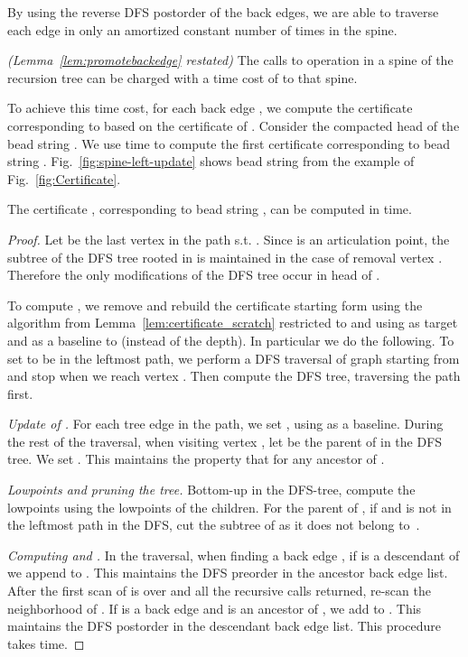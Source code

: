 By using the reverse DFS postorder of the back edges, we are able
to traverse each edge in  only an amortized constant number of
times in the spine.
\begin{lemma}
	\emph{(Lemma~\ref{lem:promotebackedge} restated)} The calls to
	operation  in a spine of the recursion tree
	can be charged with a time cost of  to that spine. 
\end{lemma}

To achieve this time cost, for each back edge , we
compute the certificate corresponding to  based on the
certificate of . Consider the compacted head  of the bead string . We use  time to
compute the first certificate  corresponding to bead string
. Fig.~\ref{fig:spine-left-update} shows bead string
 from the example of Fig.~\ref{fig:Certificate}.

\begin{lemma}
	The certificate , corresponding to bead string
	, can be computed in  time.
\end{lemma}
\begin{proof}
	Let  be the last vertex in the path  s.t.
	. Since  is an articulation point, the subtree
	of the DFS tree rooted in  is maintained in the case of
	removal vertex . Therefore the only modifications of the
	DFS tree occur in head  of .

	To compute , we remove  and rebuild the certificate
	starting form  using the algorithm from
	Lemma~\ref{lem:certificate_scratch} restricted to  and
	using  as target and  as a baseline to
	 (instead of the depth). In particular we do
	the following.
	To set  to be in the leftmost path, we perform a
	DFS traversal of graph  starting from  and stop when
	we reach vertex . Then compute the DFS tree, traversing
	the path  first.
	
	{\it Update of .} For each tree edge  in the
	 path, we set , using
	 as a baseline.  During the rest of the traversal,
	when visiting vertex , let  be the parent of  in the
	DFS tree. We set . This maintains the
	property that  for any  ancestor of
	.

	{\it Lowpoints and pruning the tree.}  Bottom-up in
	the DFS-tree, compute the lowpoints using the
	lowpoints of the children.  For  the parent of , if
	 and  is not in the
	leftmost path in the DFS, cut the subtree of  as it does
	not belong to~.

	{\it Computing  and .} In the traversal, when finding
	a back edge , if  is a descendant of  we append
	 to . This maintains the DFS preorder in the
	ancestor back edge list. After the first scan of  is
	over and all the recursive calls returned, re-scan the
	neighborhood of . If  is a back edge and  is an
	ancestor of , we add  to . This maintains the DFS
	postorder in the descendant back edge list.  This procedure
	takes  time.
\end{proof}

